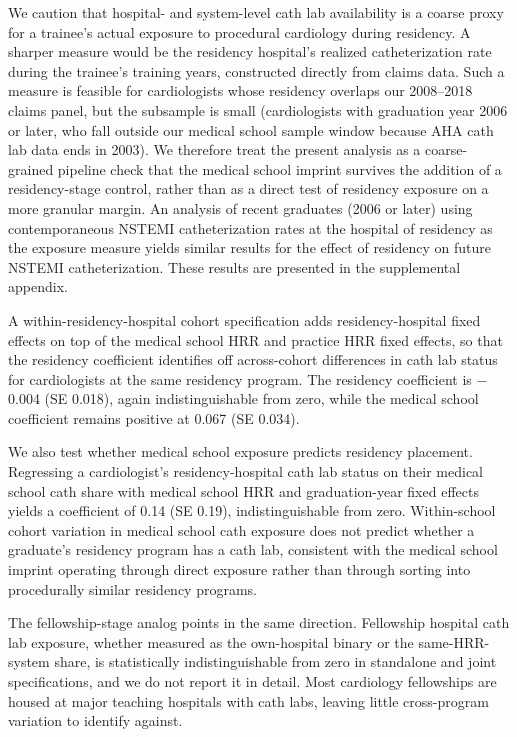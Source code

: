 \documentclass[12pt]{article}
\begin{document}
We caution that hospital- and system-level cath lab availability is a coarse proxy for a trainee's actual exposure to procedural cardiology during residency. A sharper measure would be the residency hospital's realized catheterization rate during the trainee's training years, constructed directly from claims data. Such a measure is feasible for cardiologists whose residency overlaps our 2008--2018 claims panel, but the subsample is small (cardiologists with graduation year 2006 or later, who fall outside our medical school sample window because AHA cath lab data ends in 2003). We therefore treat the present analysis as a coarse-grained pipeline check that the medical school imprint survives the addition of a residency-stage control, rather than as a direct test of residency exposure on a more granular margin. An analysis of recent graduates (2006 or later) using contemporaneous NSTEMI catheterization rates at the hospital of residency as the exposure measure yields similar results for the effect of residency on future NSTEMI catheterization. These results are presented in the supplemental appendix.

A within-residency-hospital cohort specification adds residency-hospital fixed effects on top of the medical school HRR and practice HRR fixed effects, so that the residency coefficient identifies off across-cohort differences in cath lab status for cardiologists at the same residency program. The residency coefficient is $-$0.004 (SE 0.018), again indistinguishable from zero, while the medical school coefficient remains positive at 0.067 (SE 0.034).

We also test whether medical school exposure predicts residency placement. Regressing a cardiologist's residency-hospital cath lab status on their medical school cath share with medical school HRR and graduation-year fixed effects yields a coefficient of 0.14 (SE 0.19), indistinguishable from zero. Within-school cohort variation in medical school cath exposure does not predict whether a graduate's residency program has a cath lab, consistent with the medical school imprint operating through direct exposure rather than through sorting into procedurally similar residency programs.

The fellowship-stage analog points in the same direction. Fellowship hospital cath lab exposure, whether measured as the own-hospital binary or the same-HRR-system share, is statistically indistinguishable from zero in standalone and joint specifications, and we do not report it in detail. Most cardiology fellowships are housed at major teaching hospitals with cath labs, leaving little cross-program variation to identify against.
\end{document}
